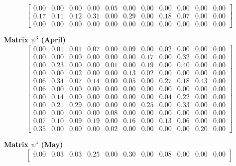 \documentclass[a4paper,fleqn]{cas-dc}
\begin{document}
\begin{scriptsize}
\[\begin{bmatrix}
0.00 & 0.00 & 0.00 & 0.00 & 0.05 & 0.00 & 0.00 & 0.00 & 0.00 & 0.00 & 0.00\\

0.17 & 0.11 & 0.12 & 0.31 & 0.00 & 0.29 & 0.00 & 0.18 & 0.07 & 0.00 & 0.00\\

0.00 & 0.00 & 0.00 & 0.00 & 0.00 & 0.00 & 0.00 & 0.00 & 0.00 & 0.00 & 0.00

\end{bmatrix}
\]

\textbf{Matrix $\psi^{3}$ (April)}
\[
\begin{bmatrix}

0.00 & 0.01 & 0.01 & 0.07 & 0.00 & 0.09 & 0.00 & 0.02 & 0.00 & 0.00 & 0.00\\

0.00 & 0.00 & 0.00 & 0.00 & 0.00 & 0.00 & 0.17 & 0.00 & 0.32 & 0.00 & 0.00\\

0.00 & 0.23 & 0.00 & 0.00 & 0.01 & 0.00 & 0.19 & 0.00 & 0.40 & 0.00 & 0.00\\

0.00 & 0.00 & 0.02 & 0.00 & 0.00 & 0.13 & 0.02 & 0.00 & 0.00 & 0.00 & 0.00\\

0.06 & 0.34 & 0.07 & 0.14 & 0.00 & 0.05 & 0.00 & 0.27 & 0.18 & 0.43 & 0.00\\

0.06 & 0.00 & 0.00 & 0.00 & 0.00 & 0.00 & 0.00 & 0.00 & 0.00 & 0.00 & 0.00\\

0.00 & 0.14 & 0.00 & 0.00 & 0.00 & 0.00 & 0.00 & 0.04 & 0.22 & 0.00 & 0.00\\

0.00 & 0.21 & 0.29 & 0.00 & 0.00 & 0.00 & 0.25 & 0.00 & 0.33 & 0.00 & 0.00\\

0.00 & 0.00 & 0.00 & 0.00 & 0.08 & 0.00 & 0.00 & 0.00 & 0.00 & 0.00 & 0.00\\

0.07 & 0.10 & 0.09 & 0.19 & 0.00 & 0.16 & 0.00 & 0.13 & 0.06 & 0.00 & 0.00\\

0.35 & 0.00 & 0.00 & 0.00 & 0.02 & 0.00 & 0.00 & 0.00 & 0.00 & 0.20 & 0.00

\end{bmatrix}
\]

\textbf{Matrix $\psi^{4}$ (May)}
\[
\begin{bmatrix}

0.00 & 0.03 & 0.03 & 0.25 & 0.00 & 0.30 & 0.00 & 0.08 & 0.00 & 0.00 & 0.00\\


\end{bmatrix}\]
\end{scriptsize}
\end{document}
